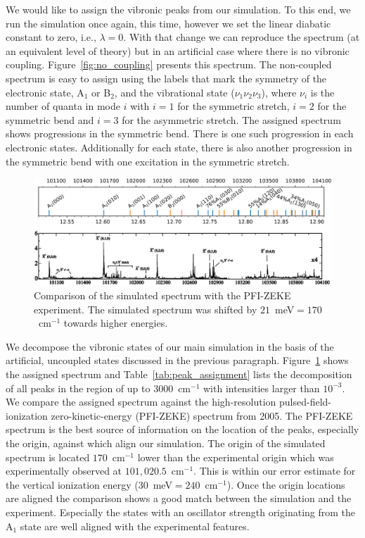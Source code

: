 \documentclass[12pt,pra,aps,superscriptaddress]{revtex4-2}
\begin{document}
We would like to assign the vibronic peaks from our simulation. To this end,
we run the simulation once again, this time, however we set the linear
diabatic constant to zero, i.e., $\lambda = 0$. With that change we can
reproduce the spectrum (at an equivalent level of theory) but in an artificial
case where there is no vibronic coupling. Figure~\ref{fig:no_coupling}
presents this spectrum. The non-coupled spectrum is easy to assign using the
labels that mark the symmetry of the electronic state, A$_1$ or B$_2$, and the
vibrational state ($\nu _1 \nu_2 \nu_3$), where $\nu _i$ is the number of
quanta in mode $i$ with $i=1$ for the symmetric stretch, $i=2$ for the
symmetric bend and $i=3$ for the asymmetric stretch. The assigned spectrum
shows progressions in the symmetric bend. There is one such progression in
each electronic states.  Additionally for each state, there is also another
progression in the symmetric bend with one excitation in the symmetric
stretch.

\begin{figure}
    \includegraphics[width=16 cm]{./figures/sim_vs_zeke}
    \caption{
        Comparison of the simulated spectrum with the PFI-ZEKE
        experiment.\cite{Willitsch:O3ZEKE:2005} The simulated spectrum was
        shifted by $21$~meV$ = 170$~cm$^{-1}$ towards higher energies.
    }
    \label{fig:sim_vs_zeke}
\end{figure}

We decompose the vibronic states of our main simulation in the basis of the
artificial, uncoupled states discussed in the previous paragraph.
Figure~\ref{fig:sim_vs_zeke} shows the assigned spectrum and
Table~\ref{tab:peak_assignment} lists the decomposition of all peaks in the
region of up to $3000$~cm$^{-1}$ with intensities larger than $10^{-3}$. We
compare the assigned spectrum against the high-resolution
pulsed-field-ionization zero-kinetic-energy (PFI-ZEKE) spectrum from
2005.\cite{Willitsch:O3ZEKE:2005} The PFI-ZEKE spectrum is the best source of
information on the location of the peaks, especially the origin, against which
align our simulation. The origin of the simulated spectrum is located
$170$~cm$^{-1}$ lower than the experimental origin which was experimentally
observed at $101,020.5$~cm$^{-1}$.\cite{Willitsch:O3ZEKE:2005} This is within
our error estimate for the vertical ionization energy
($30$~meV$=240$~cm$^{-1}$).  Once the origin locations are aligned the
comparison shows a good match between the simulation and the experiment.
Especially the states with an oscillator strength originating from the A$_1$
state are well aligned with the experimental features. 
\end{document}
